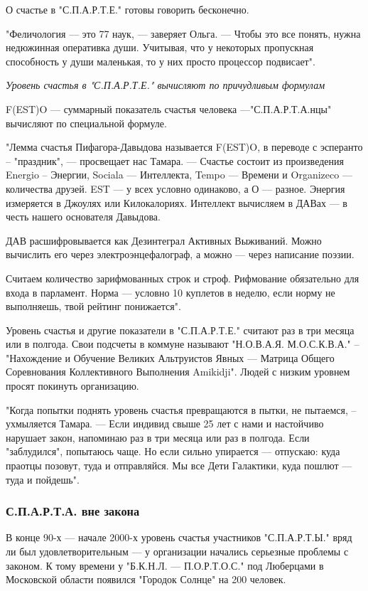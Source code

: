 \documentclass[a4paper,11pt]{extreport}
\begin{document}
О счастье в "С.П.А.Р.Т.Е." готовы говорить бесконечно.

"Феличология --- это 77 наук, --- заверяет Ольга. --- Чтобы это все понять, нужна
недюжинная оперативка души. Учитывая, что у некоторых пропускная способность у
души маленькая, то у них просто процессор подвисает".

{\em
Уровень счастья в "С.П.А.Р.Т.Е." вычисляют по причудливым формулам
\/}

F(EST)O --- суммарный показатель счастья человека —"С.П.А.Р.Т.А.нцы" вычисляют по
специальной формуле.

"Лемма счастья Пифагора-Давыдова называется F(EST)O, в переводе с эсперанто  –
"праздник", --- просвещает нас Тамара. --- Счастье состоит из произведения Energio
– Энергии, Sociala --- Интеллекта, Tempo --- Времени и Organizeco --- количества
друзей. EST --- у всех условно одинаково, а О --- разное. Энергия измеряется в
Джоулях или Килокалориях. Интеллект вычисляем в ДАВах --- в честь нашего
основателя Давыдова. 

ДАВ расшифровывается как Дезинтеграл Активных Выживаний. Можно вычислить его
через электроэнцефалограф, а можно --- через написание поэзии. 

Считаем количество зарифмованных строк и строф. Рифмование обязательно для
входа в парламент. Норма --- условно 10 куплетов в неделю, если норму не
выполняешь, твой рейтинг понижается".

Уровень счастья и другие показатели в "С.П.А.Р.Т.Е." считают раз в три месяца
или в полгода. Свои подсчеты в коммуне называют "Н.О.В.А.Я. М.О.С.К.В.А." –
"Нахождение и Обучение Великих Альтруистов Явных --- Матрица Общего Соревнования
Коллективного Выполнения Amikidji". Людей с низким уровнем просят покинуть
организацию.

"Когда попытки поднять уровень счастья превращаются в пытки, не пытаемся, –
ухмыляется Тамара. --- Если индивид свыше 25 лет с нами и настойчиво нарушает
закон, напоминаю раз в три месяца или раз в полгода. Если "заблудился",
попытаюсь чаще. Но если сильно упирается --- отпускаю: куда праотцы позовут, туда
и отправляйся. Мы все Дети Галактики, куда пошлют --- туда и пойдешь".

\subsubsection{С.П.А.Р.Т.А. вне закона}

В конце 90-х --- начале 2000-х уровень счастья участников "С.П.А.Р.Т.Ы." вряд ли
был удовлетворительным --- у организации начались серьезные проблемы с законом. К
тому времени у "Б.К.Н.Л. --- П.О.Р.Т.О.С." под Люберцами в Московской области
появился "Городок Солнце" на 200 человек. 
\end{document}

